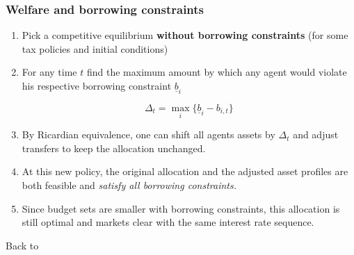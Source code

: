 \documentclass{beamer}
\begin{document}
 \begin{frame}[label=borrowing constraints]
 \frametitle{Welfare and borrowing constraints}
 \begin{enumerate}
 \item Pick a competitive equilibrium \textbf{without borrowing constraints} (for some tax policies and initial conditions)
 \item For any time $t$ find the maximum amount by which any agent would violate his respective borrowing constraint $\underline{b}_{i}$
 
 \[\Delta_t=\max_{i}\{\underline{b}_{i}-b_{i,t}\}\]
 
 \item By Ricardian equivalence, one can shift all agents assets by $\Delta_t$ and adjust transfers to keep the allocation unchanged. 
  \item At this new policy, the original allocation and the adjusted asset profiles are both feasible and \emph{satisfy all borrowing constraints.}
 \item Since budget sets are smaller with borrowing constraints, this allocation is still optimal and markets clear with the same interest rate sequence.
 \end{enumerate}
 Back to \hyperlink{back to borrowing constraints main}{}
\end{frame}

 
\end{document}

